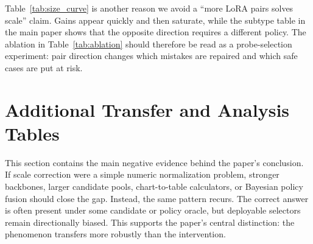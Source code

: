 \begin{table}[h]
\centering
\small
\resizebox{\textwidth}{!}{}
\caption{Seed-level fix and break rates on ChartQA validation.}
\label{tab:seed_consistency}
\end{table}

\begin{table}[h]
\centering
\small

\caption{Large-positive pair-size curve on the ChartQA-1500 setting. Gains appear with few pairs and then saturate.}
\label{tab:size_curve}
\end{table}

Table~\ref{tab:size_curve} is another reason we avoid a ``more LoRA pairs solves scale'' claim. Gains appear quickly and then saturate, while the subtype table in the main paper shows that the opposite direction requires a different policy. The ablation in Table~\ref{tab:ablation} should therefore be read as a probe-selection experiment: pair direction changes which mistakes are repaired and which safe cases are put at risk.



\section{Additional Transfer and Analysis Tables}
\label{sec:appendix_analysis}

This section contains the main negative evidence behind the paper's conclusion. If scale correction were a simple numeric normalization problem, stronger backbones, larger candidate pools, chart-to-table calculators, or Bayesian policy fusion should close the gap. Instead, the same pattern recurs. The correct answer is often present under some candidate or policy oracle, but deployable selectors remain directionally biased. This supports the paper's central distinction: the phenomenon transfers more robustly than the intervention.

\begin{table}[h]
\centering
\small
\resizebox{\linewidth}{!}{}
\caption{Cross-backbone strict scale-like error diagnostic.}
\label{tab:cross_backbone}
\end{table}

\begin{table}[h]
\centering
\small
\resizebox{\textwidth}{!}{}
\caption{Full cross-backbone and external numeric transfer table.}
\label{tab:transfer_boundary_full}
\end{table}

